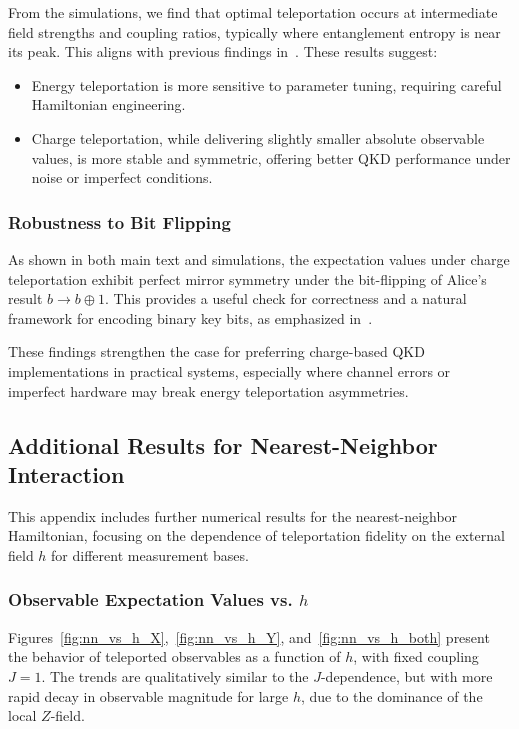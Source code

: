 From the simulations, we find that optimal teleportation occurs at intermediate field strengths and coupling ratios, typically where entanglement entropy is near its peak. This aligns with previous findings in~\cite{Ikeda2023, IkedaTeleportingCharge}. These results suggest:

\begin{itemize}
    \item Energy teleportation is more sensitive to parameter tuning, requiring careful Hamiltonian engineering.
    \item Charge teleportation, while delivering slightly smaller absolute observable values, is more stable and symmetric, offering better QKD performance under noise or imperfect conditions.
\end{itemize}

\subsubsection{Robustness to Bit Flipping}

As shown in both main text and simulations, the expectation values under charge teleportation exhibit perfect mirror symmetry under the bit-flipping of Alice’s result \( b \to b \oplus 1 \). This provides a useful check for correctness and a natural framework for encoding binary key bits, as emphasized in~\cite{QKDbyQET}.

These findings strengthen the case for preferring charge-based QKD implementations in practical systems, especially where channel errors or imperfect hardware may break energy teleportation asymmetries.

\subsection{Additional Results for Nearest-Neighbor Interaction}
\label{appendix:nn_detailed}

This appendix includes further numerical results for the nearest-neighbor Hamiltonian, focusing on the dependence of teleportation fidelity on the external field \( h \) for different measurement bases.

\subsubsection{Observable Expectation Values vs. \texorpdfstring{\( h \)}{h}}

Figures~\ref{fig:nn_vs_h_X},~\ref{fig:nn_vs_h_Y}, and~\ref{fig:nn_vs_h_both} present the behavior of teleported observables as a function of \( h \), with fixed coupling \( J=1 \). The trends are qualitatively similar to the \( J \)-dependence, but with more rapid decay in observable magnitude for large \( h \), due to the dominance of the local \( Z \)-field.

